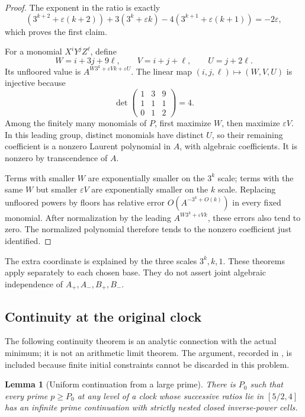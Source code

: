 \documentclass[11pt,a4paper]{article}
\numberwithin{equation}{section}
\newtheorem{lemma}[theorem]{Lemma}
\theoremstyle{definition}
\theoremstyle{remark}
\begin{document}
\begin{proof}
The exponent in the ratio is exactly
\[
 (3^{k+2}+\varepsilon(k+2))
 +3(3^k+\varepsilon k)
 -4(3^{k+1}+\varepsilon(k+1))=-2\varepsilon,
\]
which proves the first claim.

For a monomial \(X^iY^jZ^\ell\), define
\[
 W=i+3j+9\ell,\qquad V=i+j+\ell,\qquad U=j+2\ell.
\]
Its unfloored value is \(A^{W3^k+\varepsilon Vk+\varepsilon U}\).
The linear map \((i,j,\ell)\mapsto(W,V,U)\) is injective because
\[
 \det\begin{pmatrix}1&3&9\\1&1&1\\0&1&2\end{pmatrix}=4.
\]
Among the finitely many monomials of \(P\), first maximize \(W\),
then maximize \(\varepsilon V\). In this leading group, distinct
monomials have distinct \(U\), so their remaining coefficient is
a nonzero Laurent polynomial in \(A\), with algebraic coefficients.
It is nonzero by transcendence of \(A\).

Terms with smaller \(W\) are exponentially smaller on the
\(3^k\) scale; terms with the same \(W\) but smaller
\(\varepsilon V\) are exponentially smaller on the \(k\) scale.
Replacing unfloored powers by floors has relative error
\(O(A^{-3^k+O(k)})\) in every fixed monomial. After normalization
by the leading \(A^{W3^k+\varepsilon Vk}\), these errors also
tend to zero. The normalized polynomial therefore tends to the
nonzero coefficient just identified.
\end{proof}

The extra coordinate is explained by the three scales
\(3^k,k,1\). These theorems apply separately to each chosen base.
They do not assert joint algebraic independence of
\(A_+,A_-,B_+,B_-\).

\subsection{Continuity at the original clock}
\label{mi:continuity}

The following continuity theorem is an analytic connection with
the actual minimum; it is not an arithmetic limit theorem.
The argument, recorded in \cite{VMRC075}, is included because
finite initial constraints cannot be discarded in this problem.

\begin{lemma}[Uniform continuation from a large prime]
\label{mi:continuation}
There is \(P_0\) such that every prime \(p\ge P_0\) at any level
of a clock whose successive ratios lie in \([5/2,4]\) has an
infinite prime continuation with strictly nested closed
inverse-power cells.
\end{lemma}
\end{document}
